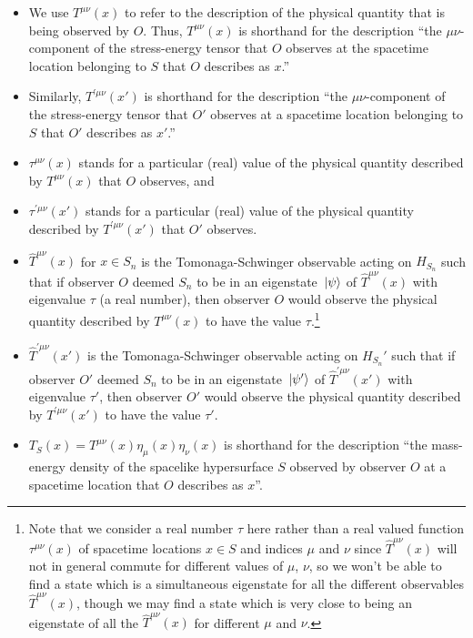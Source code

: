 \begin{itemize}
\item We use $T^{\mu\nu}(x)$ to refer to the description of the physical quantity that is being observed by $O$. Thus, $T^{\mu\nu}(x)$ is shorthand for the description ``the $\mu\nu$-component of the stress-energy tensor that $O$ observes at the spacetime location belonging to $S$ that $O$ describes as  $x$.'' 
\item Similarly,  $T^{\prime\mu\nu}(x')$ is shorthand for the description ``the $\mu\nu$-component of the stress-energy tensor that $O'$ observes at a spacetime location  belonging to $S$ that $O'$ describes as $x'$.'' 
\item $\tau^{\mu\nu}(x)$ stands for a particular (real) value of the physical quantity described by $T^{\mu\nu}(x)$ that $O$ observes, and 
\item $\tau^{\prime\mu\nu}(x')$ stands for a particular (real) value of the physical quantity described by $T^{\prime\mu\nu}(x')$ that $O'$ observes.
\item $\hat{T}^{\mu\nu}(x)$ for $x\in S_n$ is the Tomonaga-Schwinger observable acting on $H_{S_n}$ such that if observer $O$ deemed $S_n$ to be in an eigenstate $\ket*{\psi}$ of $\hat{T}^{\mu\nu}(x)$ with eigenvalue $\tau$ (a real number), then observer $O$ would observe the physical quantity described by  $T^{\mu\nu}(x)$ to have the value $\tau$.\footnote{Note that we consider a real number $\tau$ here rather than a real valued function $\tau^{\mu\nu}(x)$ of spacetime locations $x\in S$ and indices $\mu$ and $\nu$ since $\hat{T}^{\mu\nu}(x)$ will not in general commute for different values of $\mu$, $\nu$, so we won't be able to find a state which is a simultaneous eigenstate for all the different observables $\hat{T}^{\mu\nu}(x)$, though we may find a state which is very close to being an eigenstate of all the  $\hat{T}^{\mu\nu}(x)$ for different $\mu$ and $\nu$.} 
\item $\hat{T}^{\prime\mu\nu}(x')$ is the Tomonaga-Schwinger observable acting on $H_{S_n}'$ such that if observer $O'$ deemed $S_n$ to be in an eigenstate $\ket*{\psi'}$ of  $\hat{T}^{\prime\mu\nu}(x')$ with eigenvalue $\tau'$, then observer $O'$ would observe the physical quantity described by  $T^{\prime\mu\nu}(x')$ to have the value $\tau'$. 
\item $T_S(x)={T}^{\mu\nu}(x)\eta_{\mu}(x)\eta_{\nu}(x)$ is shorthand for the description ``the mass-energy density of the spacelike hypersurface $S$ observed by observer $O$ at a spacetime location that $O$ describes as $x$''. 

\end{itemize}
